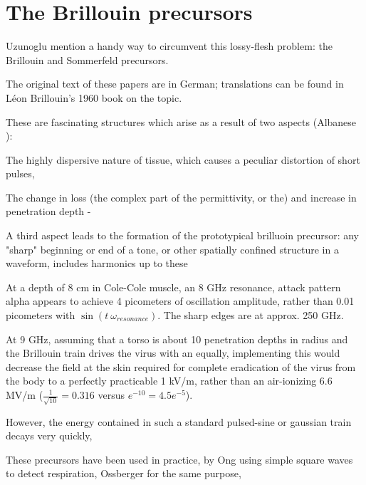 \documentclass[paper.tex]{subfiles}
\begin{document}
\section{The Brillouin precursors}

Uzunoglu \cite{Theoretical2020} mention a handy way to circumvent this lossy-flesh problem: the Brillouin and Sommerfeld precursors.

The original text of these papers are in German; translations can be found in Léon Brillouin's 1960 
book\cite{Wave1960} on the topic. \footnotemark

These are fascinating structures which arise as a result of two aspects (Albanese 
\cite{Shortrisetime1989}): 

The highly dispersive nature of tissue, which causes a peculiar distortion of short pulses,

The change in loss (the complex part of the permittivity, or the) and increase in penetration depth 
- 

A third aspect leads to the formation of the prototypical brilluoin precursor: any "sharp" 
beginning or end of a tone, or other spatially confined structure in a waveform, includes harmonics 
up to these \footnotemark


At a depth of 8 cm in Cole-Cole muscle, an 8 GHz resonance, attack pattern alpha appears to achieve 4 picometers of oscillation amplitude, rather than 0.01 picometers with $\sin(t\ \omega_{resonance})$. The sharp edges are at approx. 250 GHz. 



At 9 GHz, assuming that a torso is about 10 penetration depths in radius and the Brillouin train 
drives the virus with an equally, implementing this would decrease the field at the skin required 
for complete eradication of the virus from the body to a perfectly practicable 1 kV/m, rather than 
an air-ionizing 6.6 MV/m ($\frac{1}{\sqrt{10}}=0.316$ versus $e^{-10}=4.5e^{-5}$). 

However, the energy contained in such a standard pulsed-sine or gaussian train decays very quickly, 

These precursors have been used in practice, by Ong \cite{Detection2003} using simple square waves to detect respiration\footnotemark, Ossberger \cite{Noninvasive2004} for the same purpose,
\end{document}
